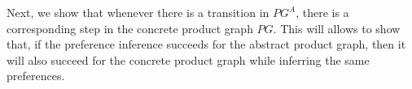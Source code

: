 \documentclass[twocolumn, openany]{sig-alternate-10pt}
\begin{document}
%



\vspace{1em}

Next, we show that whenever there is a transition in $PG^A$, there is a corresponding step in the concrete product graph $PG$. This will allows to show that, if the preference inference succeeds for the abstract product graph, then it will also succeed for the concrete product graph while inferring the same preferences.

\vspace{1em}
\end{document}
